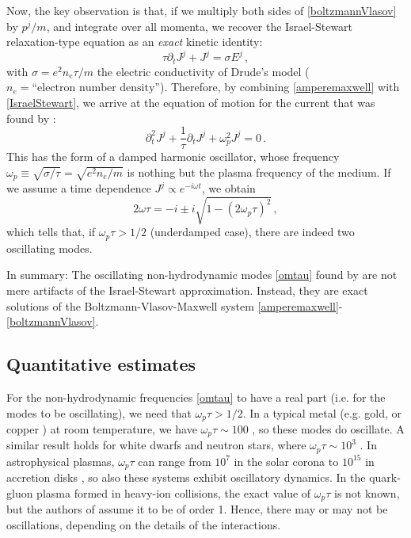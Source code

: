 \documentclass[a4paper, amsfonts, amssymb, amsmath, reprint, showkeys, nofootinbib, twoside,notitlepage,onecolumn]{revtex4-1}
\theoremstyle{definition}
\theoremstyle{theorem}
\begin{document}
Now, the key observation is that, if we multiply both sides of \eqref{boltzmannVlasov} by $p^j/m$, and integrate over all momenta, we recover the Israel-Stewart relaxation-type equation as an \textit{exact} kinetic identity: 
\begin{equation}\label{IsraelStewart}
\tau \partial_t J^j+J^j=\sigma E^j \, ,
\end{equation}
with $\sigma=e^2 n_e\tau/m$ the electric conductivity of Drude's model ($n_e=\text{``electron number density''}$). Therefore, by combining \eqref{amperemaxwell} with \eqref{IsraelStewart}, we arrive at the equation of motion for the current that was found by \cite{Dash:2022xkz}:
\begin{equation}\label{plasmafrequency}
\partial^2_t J^j +\dfrac{1}{\tau} \partial_t J^j +\omega_p^2 J^j =0 \, .
\end{equation}
This has the form of a damped harmonic oscillator, whose frequency $\omega_p\equiv \sqrt{\sigma/\tau}=\sqrt{e^2 n_e/m}$ is nothing but the plasma frequency of the medium. If we assume a time dependence $J^j\propto e^{-i\omega t}$, we obtain
\begin{equation}\label{omtau}
2\omega\tau=-i\pm i\sqrt{1-(2\omega_p \tau)^2} \, ,
\end{equation}
which tells that, if $\omega_p\tau>1/2$ (underdamped case), there are indeed two oscillating modes.

In summary: The oscillating non-hydrodynamic modes \eqref{omtau} found by \cite{Dash:2022xkz} are not mere artifacts of the Israel-Stewart approximation. Instead, they are exact solutions of the Boltzmann-Vlasov-Maxwell system \eqref{amperemaxwell}-\eqref{boltzmannVlasov}.

\subsection{Quantitative estimates}

For the non-hydrodynamic frequencies \eqref{omtau} to have a real part (i.e. for the modes to be oscillating), we need that $\omega_p \tau>1/2$. In a typical metal (e.g. gold, or copper \cite{Youn2007ExtendedDrude}) at room temperature, we have $\omega_p\tau \sim 100$ \cite[\S 1]{ashcroft1976solid}, so these modes do oscillate. A similar result holds for white dwarfs and neutron stars, where $\omega_p\tau \sim 10^3$ \cite{YakovlevUrpin1980}. In astrophysical plasmas, $\omega_p \tau$ can range from $10^7$ in the solar corona to $10^{15}$ in accretion disks \cite{NRLFormulary,Draine2011,Sarazin1988,Aschwanden2005,KivelsonRussell1995,Frank2002,NarayanYi1995,Quataert1998}, so also these systems exhibit oscillatory dynamics. In the quark-gluon plasma formed in heavy-ion collisions, the exact value of $\omega_p \tau$ is not known, but the authors of \cite{Dash:2022xkz} assume it to be of order 1. Hence, there may or may not be oscillations, depending on the details of the interactions.
\end{document}
